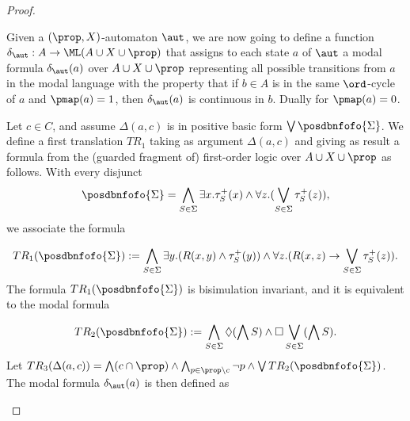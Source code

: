 \begin{proof}
\begin{pfclaim}
Given a $(\prop,X)$-automaton $\aut$, we are now going to define a function $\delta_\aut: A \to \ML (A \cup X \cup \prop)$
that assigns to each state $a$ of $\aut$ a modal formula $\delta_\aut(a)$ over  $A \cup X \cup \prop$ representing all possible transitions from $a$ in the modal language with the property that if $b \in A$ is in the same $\ord$-cycle of $a$ and $\pmap(a)=1$, then  $\delta_\aut(a)$ is continuous in $b$. Dually for $\pmap(a)=0$.

Let $c \in C$, and assume $\Delta(a,c)$ is in positive basic form $\bigvee \posdbnfofo{\Sigma}$. We define a first translation $TR_1$ taking as argument $\Delta(a,c)$ and giving as result a formula from the (guarded fragment of) first-order logic over $A \cup X \cup \prop$ as follows. %
With every disjunct
$$
\posdbnfofo{\Sigma} = \bigwedge_{S\in\Sigma} \exists x. \tau^+_{S}(x) \land \forall z.( \bigvee_{S\in \Sigma} \tau^+_S(z)),
$$
%
we associate the formula

$$
TR_1(\posdbnfofo{\Sigma}) := \bigwedge_{S\in\Sigma} \exists y. (R(x,y) \land \tau^+_{S}(y)) \land \forall z.( R(x,z) \to \bigvee_{S\in \Sigma} \tau^+_S(z)).
$$
The formula $TR_1(\posdbnfofo{\Sigma})$ is bisimulation invariant, and it is equivalent to the modal formula

$$
TR_2(\posdbnfofo{\Sigma}) := \bigwedge_{S\in\Sigma}  \Diamond(\bigwedge S) \land \Box \bigvee_{S\in \Sigma} (\bigwedge S).
$$
Let $TR_3(\Delta(a,c))= \bigwedge (c \cap \prop) \land \bigwedge_{p \in \prop \setminus c} \lnot p \land \bigvee TR_2(\posdbnfofo{\Sigma})$.
 The modal formula $\delta_\aut(a)$ is then defined as


\end{pfclaim}
\end{proof}
